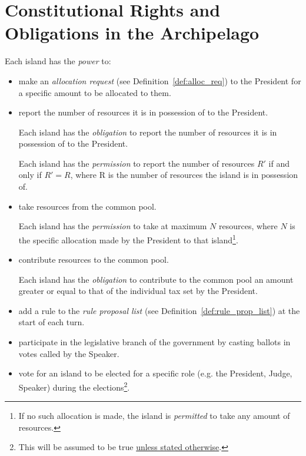 \section{Constitutional Rights and Obligations in the Archipelago}
\label{sec:const_rights_obl_archi}
Each island has the \emph{power} to:
\begin{itemize}
\item make an \emph{allocation request} (see Definition~\ref{def:alloc_req}) to the President for a specific amount to be allocated to them.
\item report the number of resources it is in possession of to the President.
\begin{rule_IIGO}
    Each island has the \emph{obligation} to report the number of resources it is in possession of to the President.
\end{rule_IIGO}
\begin{rule_IIGO}
    Each island has the \emph{permission} to report the number of resources $R'$ if and only if $R' = R$, where R is the number of resources the island is in possession of.
\end{rule_IIGO}
\item take resources from the common pool.


\begin{rule_IIGO}
    Each island has the \emph{permission} to take at maximum $N$ resources, where $N$ is the specific allocation made by the President to that island\footnote{If no such allocation is made, the island is \emph{permitted} to take any amount of resources.}.
\end{rule_IIGO}
\item contribute resources to the common pool.
\begin{rule_IIGO}
    Each island has the \emph{obligation} to contribute to the common pool an amount greater or equal to that of the individual tax set by the President.
\end{rule_IIGO}
\item add a rule to the \emph{rule proposal list} (see Definition~\ref{def:rule_prop_list}) at the start of each turn.
\item participate in the legislative branch of the government by casting ballots in votes called by the Speaker.
\item vote for an island to be elected for a specific role (e.g. the President, Judge, Speaker) during the elections\footnote{This will be assumed to be true \underline{unless stated otherwise}. %
        }.
\end{itemize}
